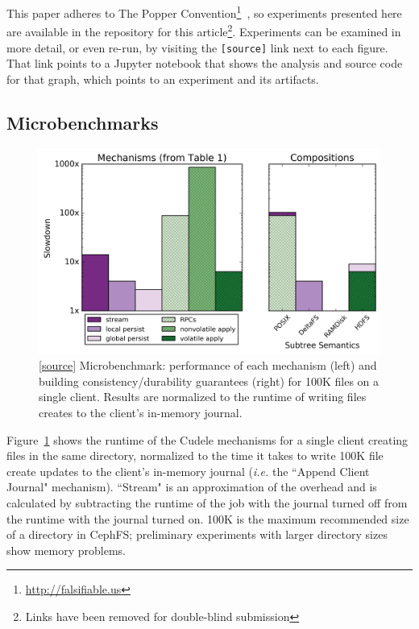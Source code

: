 This paper adheres to The Popper
Convention\footnote{\url{http://falsifiable.us}}~\cite{jimenez_popper_2016}, so
experiments presented here are available in the repository for this
article\footnote{Links have been removed for double-blind submission}.
Experiments can be examined in more detail, or even re-run, by visiting the
\texttt{[source]} link next to each figure. That link points to a Jupyter
notebook that shows the analysis and source code for that graph, which points
to an experiment and its artifacts.

\subsection{Microbenchmarks}
\label{sec:microbenchmarks}
\begin{figure}[tb]
\centering
\includegraphics[width=1.0\linewidth]{graphs/composable-mechanisms.png}
\caption{ [\href{https://...}{source}] Microbenchmark: performance of each
mechanism (left) and building consistency/durability guarantees (right) for
100K files on a single client. Results are normalized to the runtime of writing
files creates to the client's in-memory journal.
\label{fig:composable-mechanisms}}
\end{figure}


Figure~\ref{fig:composable-mechanisms} shows the runtime of the Cudele
mechanisms for a single client creating files in the same directory, normalized
to the time it takes to write 100K file create updates to the client's
in-memory journal ({\it i.e.} the ``Append Client Journal" mechanism).
``Stream" is an approximation of the overhead and is calculated by subtracting
the runtime of the job with the journal turned off from the runtime with the
journal turned on.  100K is the maximum recommended size of a directory in
CephFS; preliminary experiments with larger directory sizes show memory
problems.

